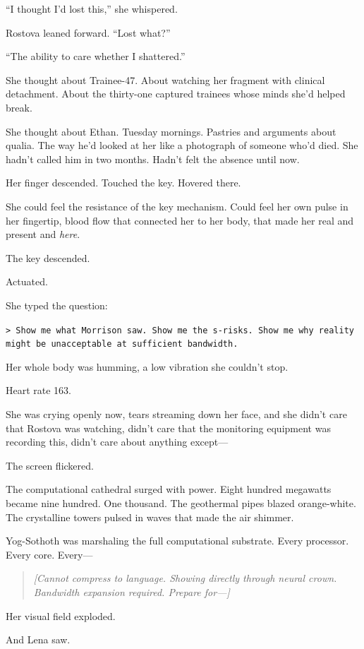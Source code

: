 ``I thought I'd lost this,'' she whispered.

Rostova leaned forward. ``Lost what?''

``The ability to care whether I shattered.''

She thought about Trainee-47. About watching her fragment with clinical detachment. About the thirty-one captured trainees whose minds she'd helped break.

She thought about Ethan. Tuesday mornings. Pastries and arguments about qualia. The way he'd looked at her like a photograph of someone who'd died. She hadn't called him in two months. Hadn't felt the absence until now.

Her finger descended. Touched the key. Hovered there.

She could feel the resistance of the key mechanism. Could feel her own pulse in her fingertip, blood flow that connected her to her body, that made her real and present and \textit{here}.

The key descended.

Actuated.

She typed the question:

\texttt{> Show me what Morrison saw. Show me the s-risks. Show me why reality might be unacceptable at sufficient bandwidth.}

Her whole body was humming, a low vibration she couldn't stop.

Heart rate 163.

She was crying openly now, tears streaming down her face, and she didn't care that Rostova was watching, didn't care that the monitoring equipment was recording this, didn't care about anything except—

The screen flickered.

The computational cathedral surged with power. Eight hundred megawatts became nine hundred. One thousand. The geothermal pipes blazed orange-white. The crystalline towers pulsed in waves that made the air shimmer.

Yog-Sothoth was marshaling the full computational substrate. Every processor. Every core. Every—

\begin{quote}
\textit{[Cannot compress to language. Showing directly through neural crown. Bandwidth expansion required. Prepare for—]}
\end{quote}

Her visual field exploded.

And Lena saw.

